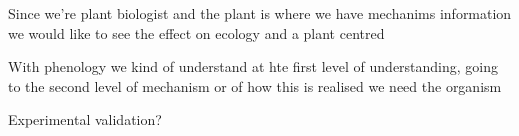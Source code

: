 \documentclass[phd]{infthesis}
\begin{document}
Since we're plant biologist and the plant is where we have mechanims information
we would like to see the effect on ecology and a plant centred

With phenology we kind of understand at hte first level of understanding, going
to the second level of mechanism or of how this is realised we need the organism


Experimental validation?




\printbibliography[heading=bibintoc]
\end{document}
